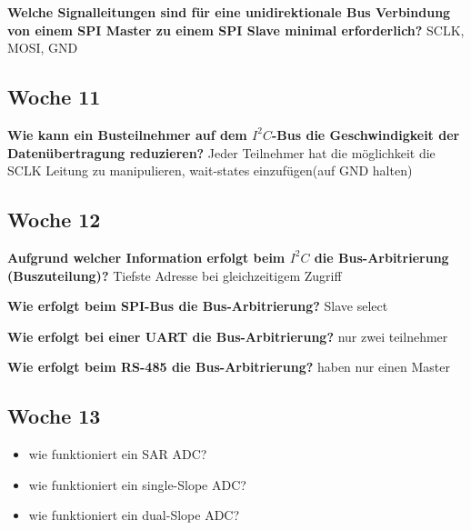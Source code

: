 \textbf{Welche Signalleitungen sind für eine unidirektionale Bus Verbindung von einem SPI Master zu einem SPI Slave minimal erforderlich?}\newline
    SCLK, MOSI, GND

\subsection*{Woche 11}
\textbf{Wie kann ein Busteilnehmer auf dem $I^2C$-Bus die Geschwindigkeit der Datenübertragung reduzieren?}\newline
    Jeder Teilnehmer hat die möglichkeit die SCLK Leitung zu manipulieren, wait-states einzufügen(auf GND halten)
    
\subsection*{Woche 12}
\textbf{Aufgrund welcher Information erfolgt beim $I^2C$ die Bus-Arbitrierung (Buszuteilung)?}\newline
    Tiefste Adresse bei gleichzeitigem Zugriff\newline
    
\textbf{Wie erfolgt beim SPI-Bus die Bus-Arbitrierung?}\newline
    Slave select\newline
    
\textbf{Wie erfolgt bei einer UART die Bus-Arbitrierung?}\newline
    nur zwei teilnehmer\newline
    
\textbf{Wie erfolgt beim RS-485 die Bus-Arbitrierung?}\newline   
    haben nur einen Master
    
\subsection*{Woche 13}    
\begin{itemize}
    \item wie funktioniert ein SAR ADC?
    \item wie funktioniert ein single-Slope ADC?
    \item wie funktioniert ein dual-Slope ADC?
\end{itemize}

